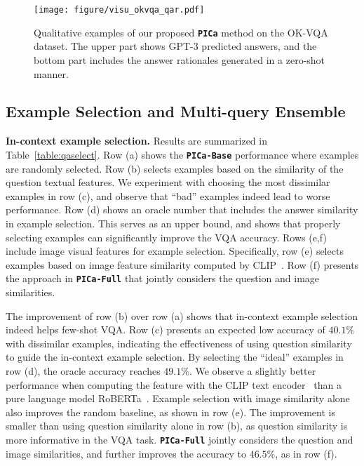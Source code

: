 \begin{figure*}[t]
\begin{center}
  \centerline{\texttt{[image: figure/visu\_okvqa\_qar.pdf]}}
\end{center}
\vspace{-0.3in}
    \caption{\small Qualitative examples of our proposed \textbf{\texttt{PICa}} method on the OK-VQA dataset. The upper part shows GPT-3 predicted answers, and the bottom part includes the answer rationales generated in a zero-shot manner.
	}
\vspace{-0.1in}
\label{fig:okvisu}
\end{figure*}


\subsection{Example Selection and Multi-query Ensemble}
\noindent\textbf{In-context example selection.}
Results are summarized in Table~\ref{table:qaselect}. 
Row (a) shows the \textbf{\texttt{PICa-Base}} performance where examples are randomly selected. Row (b) selects examples based on the similarity of the question textual features. We experiment with choosing the most dissimilar examples in row (c), and observe that ``bad'' examples indeed lead to worse performance. Row (d) shows an oracle number that includes the answer similarity in example selection. This serves as an upper bound, and shows that properly selecting examples can significantly improve the VQA accuracy. Rows (e,f) include image visual features for example selection. Specifically, row (e) selects examples based on image feature similarity computed by CLIP~\cite{radford2021learning}. Row (f) presents the approach in \textbf{\texttt{PICa-Full}} that jointly considers the question and image similarities. 

The improvement of row (b) over row (a) shows that in-context example selection indeed helps few-shot VQA. Row (c) presents an expected low accuracy of $40.1\%$ with dissimilar examples, indicating the effectiveness of using question similarity to guide the in-context example selection. By selecting the ``ideal'' examples in row (d), the oracle accuracy reaches $49.1\%$. We observe a slightly better performance when computing the feature with the CLIP text encoder~\cite{radford2021learning} than a pure language model RoBERTa~\cite{liu2019roberta}. 
Example selection with image similarity alone also improves the random baseline, as shown in row (e). The improvement is smaller than using question similarity alone in row (b), as question similarity is more informative in the VQA task. \textbf{\texttt{PICa-Full}} jointly considers the question and image similarities, and further improves the accuracy to $46.5\%$, as in row (f).


